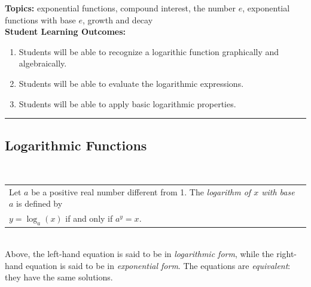 

\noindent \textbf{Topics:}  exponential functions, compound interest, the number $e$, exponential functions with base $e$, growth and decay\\

\noindent \textbf{Student Learning Outcomes:}
\begin{enumerate}
\item Students will be able to recognize a logarithic function graphically and algebraically.
\item Students will be able to evaluate the logarithmic expressions.
\item Students will be able to apply basic logarithmic properties.
\end{enumerate}

\hrule 

\bigskip

\subsection{Logarithmic Functions} ~

\noindent\begin{tabular}{ | l  |} \hline
\noindent  Let $a$ be a positive real number different from 1. The \emph{logarithm of $x$ with base $a$} is defined by   \\
\hspace{1.5in} $y = \log_a(x)$    if and only if   $a^y=x$. \\  \hline
\end{tabular} \\

\noindent Above, the left-hand equation is said to be in \emph{logarithmic form}, while the right-hand equation is said to be in \emph{exponential form}. The equations are \emph{equivalent}: they have the same solutions. 


